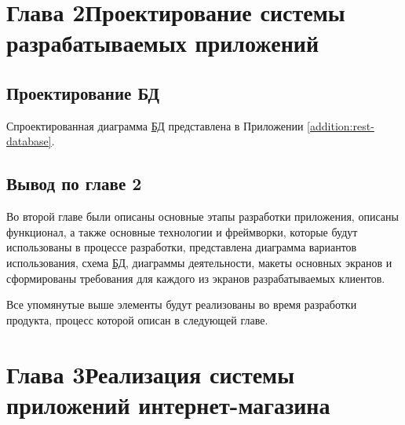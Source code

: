 \documentclass[14pt,a4paper]{scrartcl}
\begin{document}
    \pagestyle{empty}

    

    

    \clearpage
    \tableofcontents\thispagestyle{empty}

   
    \pagestyle{plain}
    
    

    \section[Глава 2 Проектирование системы разрабатываемых приложений]{Глава 2\break Проектирование системы разрабатываемых приложений}
    \label{sec:charpter-2-designing}

    
    
    
    

    \subsection{Проектирование БД}\label{subsec:design-db}\indent

    Спроектированная диаграмма \hyperlink{gloss:db}{БД} представлена в Приложении \ref{addition:rest-database}.

    
    
    
    

    \subsection{Вывод по главе 2}\label{subsec:2-conclusion}\indent

    Во второй главе были описаны основные этапы разработки приложения, описаны функционал, а также основные технологии и фреймворки, которые будут использованы в процессе разработки, представлена диаграмма вариантов использования, схема \hyperlink{gloss:db}{БД}, диаграммы деятельности, макеты основных экранов и сформированы требования для каждого из экранов разрабатываемых клиентов.

    Все упомянутые выше элементы будут реализованы во время разработки продукта, процесс которой описан в следующей главе.

    \section[Глава 3 Реализация системы приложений интернет-магазина]{Глава 3\break Реализация системы приложений интернет-магазина}
    \label{sec:charpter-3-inplementation}
\end{document}
